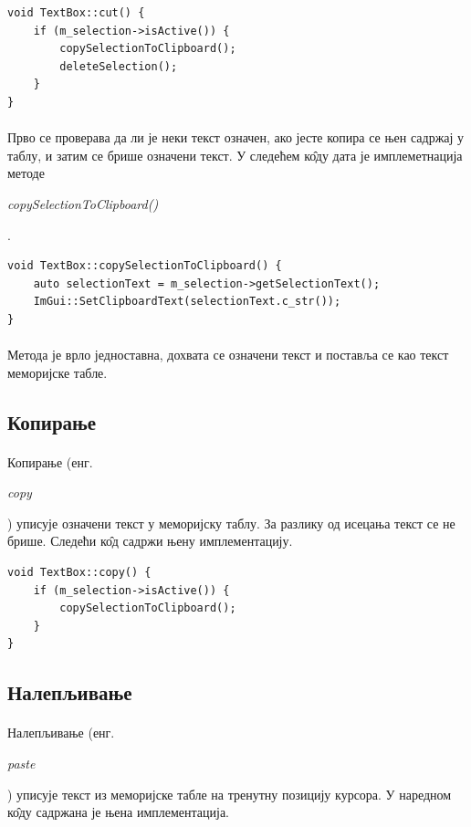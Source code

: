 \documentclass[12pt,oneside]{memoir}
\begin{document}
\begin{verbatim}
void TextBox::cut() {
	if (m_selection->isActive()) {
		copySelectionToClipboard();
		deleteSelection();
	}
}
\end{verbatim}

\paragraph{}
Прво се проверава да ли је неки текст означен, ако јесте копира се њен садржај у
таблу, и затим се брише означени текст. У следећем к\^{о}ду дата је имплеметнација
методе \begin{latinica}\textit{copySelectionToClipboard()}\end{latinica}.

\begin{verbatim}
void TextBox::copySelectionToClipboard() {
	auto selectionText = m_selection->getSelectionText();
	ImGui::SetClipboardText(selectionText.c_str());
}
\end{verbatim}

\paragraph{}
Метода је врло једноставна, дохвата се означени текст и поставља се као
текст меморијске табле.

\subsection{Копирање}
\paragraph{}
Копирање (енг. \begin{latinica}\textit{copy}\end{latinica}) уписује означени
текст у меморијску таблу. За разлику од исецања текст се не брише. Следећи к\^{о}д
садржи њену имплементацију.

\begin{verbatim}
void TextBox::copy() {
	if (m_selection->isActive()) {
		copySelectionToClipboard();
	}
}
\end{verbatim}

\subsection{Налепљивање}
\paragraph{}
Налепљивање (енг. \begin{latinica}\textit{paste}\end{latinica}) уписује текст из
меморијске табле на тренутну позицију курсора. У наредном к\^{о}ду садржана је њена
имплементација.
\end{document}
